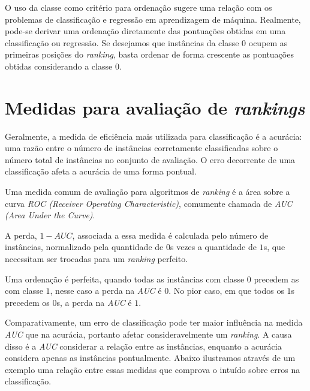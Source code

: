 O uso da classe como critério para ordenação sugere uma relação com os problemas
de classificação e regressão em aprendizagem de máquina. Realmente, pode-se
derivar uma ordenação diretamente das pontuações obtidas em uma classificação ou
regressão. Se desejamos que instâncias da classe $0$ ocupem as primeiras
posições do \emph{ranking}, basta ordenar de forma crescente as pontuações
obtidas considerando a classe $0$.

\section{Medidas para avaliação de \emph{rankings}}

Geralmente, a medida de eficiência mais utilizada para classificação é a
acurácia: uma razão entre o número de instâncias corretamente classificadas
sobre o número total de instâncias no conjunto de avaliação. O erro decorrente
de uma classificação afeta a acurácia de uma forma pontual.

Uma medida comum de avaliação para algoritmos de \emph{ranking} é a área sobre a
curva \emph{ROC (Receiver Operating Characteristic)}, comumente chamada de
\emph{AUC (Area Under the Curve)}.

A perda, $1 - AUC$, associada a essa medida é calculada pelo número de instâncias, normalizado pela quantidade de $0$s vezes a quantidade de $1$s, que necessitam ser trocadas para um \emph{ranking} perfeito.

Uma ordenação é perfeita, quando todas as instâncias com classe $0$ precedem as com classe $1$, nesse caso a perda na \emph{AUC} é $0$. No pior caso, em que todos os $1$s precedem os $0$s, a perda na \emph{AUC} é $1$.

Comparativamente, um erro de classificação pode ter maior influência na medida \emph{AUC} que na acurácia, portanto afetar consideravelmente um \emph{ranking}. A causa disso é a \emph{AUC} considerar a relação entre as instâncias, enquanto a acurácia considera apenas as instâncias pontualmente. Abaixo ilustramos através de um exemplo uma relação entre essas medidas que comprova o intuído sobre erros na classificação.

